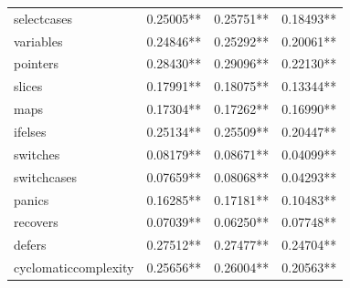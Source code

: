 \documentclass{seal_thesis}
\begin{document}
\begin{table}[H]
\begin{tabular}{@{}llll@{}}
		selectcases & \cellcolor[HTML]{C0C0C0}0.25005** & \cellcolor[HTML]{FFCC99}0.25751** & \cellcolor[HTML]{99CCFF}0.18493** \\
		variables & \cellcolor[HTML]{C0C0C0}0.24846** & \cellcolor[HTML]{C0C0C0}0.25292** & \cellcolor[HTML]{99CCFF}0.20061** \\
		pointers & \cellcolor[HTML]{FFCC99}0.28430** & \cellcolor[HTML]{FFCC99}0.29096** & \cellcolor[HTML]{C0C0C0}0.22130** \\
		slices & \cellcolor[HTML]{99CCFF}0.17991** & \cellcolor[HTML]{99CCFF}0.18075** & \cellcolor[HTML]{99CCFF}0.13344** \\
		maps & \cellcolor[HTML]{99CCFF}0.17304** & \cellcolor[HTML]{99CCFF}0.17262** & \cellcolor[HTML]{99CCFF}0.16990** \\
		ifelses & \cellcolor[HTML]{C0C0C0}0.25134** & \cellcolor[HTML]{FFCC99}0.25509** & \cellcolor[HTML]{99CCFF}0.20447** \\
		switches & \cellcolor[HTML]{99CCFF}0.08179** & \cellcolor[HTML]{99CCFF}0.08671** & \cellcolor[HTML]{3366FF}0.04099** \\
		switchcases & \cellcolor[HTML]{99CCFF}0.07659** & \cellcolor[HTML]{99CCFF}0.08068** & \cellcolor[HTML]{3366FF}0.04293** \\
		panics & \cellcolor[HTML]{99CCFF}0.16285** & \cellcolor[HTML]{99CCFF}0.17181** & \cellcolor[HTML]{99CCFF}0.10483** \\
		recovers & \cellcolor[HTML]{3366FF}0.07039** & \cellcolor[HTML]{3366FF}0.06250** & \cellcolor[HTML]{99CCFF}0.07748** \\
		defers & \cellcolor[HTML]{FFCC99}0.27512** & \cellcolor[HTML]{FFCC99}0.27477** & \cellcolor[HTML]{C0C0C0}0.24704** \\
		cyclomaticcomplexity & \cellcolor[HTML]{FFCC99}0.25656** & \cellcolor[HTML]{FFCC99}0.26004** & \cellcolor[HTML]{99CCFF}0.20563** \\
		\bottomrule
	\end{tabular}
\end{table}
\end{document}
